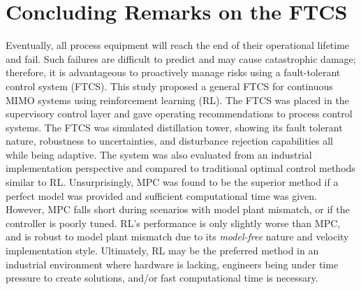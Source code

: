 \section{Concluding Remarks on the FTCS}
Eventually, all process equipment will reach the end of their operational lifetime and fail.  Such failures are difficult to predict and may cause catastrophic damage; therefore, it is advantageous to proactively manage risks using a fault-tolerant control system (FTCS).  This study proposed a general FTCS for continuous MIMO systems using reinforcement learning (RL). The FTCS was placed in the supervisory control layer and gave operating recommendations to process control systems. The FTCS was simulated distillation tower, showing its fault tolerant nature, robustness to uncertainties, and disturbance rejection capabilities all while being adaptive. The system was also evaluated from an industrial implementation perspective and compared to traditional optimal control methods similar to RL.  Unsurprisingly, MPC was found to be the superior method if a perfect model was provided and sufficient computational time was given. However, MPC falls short during scenarios with model plant mismatch, or if the controller is poorly tuned. RL's performance is only slightly worse than MPC, and is robust to model plant mismatch due to its \textit{model-free} nature and velocity implementation style. Ultimately, RL may be the preferred method in an industrial environment where hardware is lacking, engineers being under time pressure to create solutions, and/or fast computational time is necessary.